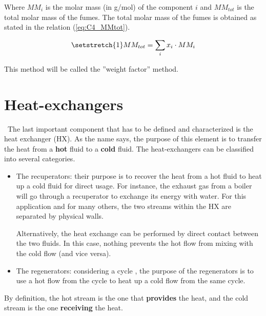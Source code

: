 Where \(MM_i\) is the molar mass (in g/mol) of the component \(i\) and \(MM_{tot}\) is the total molar mass of the fumes. The total molar mass of the fumes is obtained as stated in the relation (\ref{eq:C4_MMtot}).

\begin{equation}
    \setstretch{1}
    MM_{tot} = \sum_i x_i\cdot MM_i \label{eq:C4_MMtot}
\end{equation}

This method will be called the ''weight factor'' method.

\section{Heat-exchangers}
\quad\ The last important component that has to be defined and characterized is the heat exchanger (HX). As the name says, the purpose of this element is to transfer the heat from a \textbf{hot} fluid to a \textbf{cold} fluid. The heat-exchangers can be classified into several categories\cite{Ngendakumana2018}.

\begin{itemize}
    \item The recuperators: their purpose is to recover the heat from a hot fluid to heat up a cold fluid for direct usage. For instance, the exhaust gas from a boiler will go through a recuperator to exchange its energy with water. For this application and for many others, the two streams within the HX are separated by physical walls.

    Alternatively, the heat exchange can be performed by direct contact between the two fluids. In this case, nothing prevents the hot flow from mixing with the cold flow (and vice versa).
    \item The regenerators: considering a cycle , the purpose of the regenerators is to use a hot flow from the cycle to heat up a cold flow from the same cycle.
\end{itemize}

By definition, the hot stream is the one that \textbf{provides} the heat, and the cold stream is the one \textbf{receiving} the heat.

